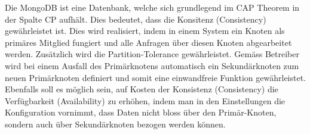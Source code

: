 Die MongoDB ist eine Datenbank, welche sich grundlegend im CAP Theorem in der Spalte CP aufhält. Dies bedeutet, dass die Konsitenz (Consistency) gewährleistet ist. Dies wird realisiert, indem in einem System ein Knoten als primäres Mitglied fungiert und alle Anfragen über diesen Knoten abgearbeitet werden. Zusätzlich wird die Partition-Tolerance gewährleistet. 
Gemäss Betreiber wird bei einem Ausfall des Primärknotens automatisch ein Sekundärknoten zum neuen Primärknoten definiert und somit eine einwandfreie Funktion gewährleistet. Ebenfalls soll es möglich sein, auf Kosten der Konsistenz (Consistency) die Verfügbarkeit (Availability) zu erhöhen, indem man in den Einstellungen die Konfiguration vornimmt, dass Daten nicht bloss über den Primär-Knoten, sondern auch über Sekundärknoten bezogen werden können.



